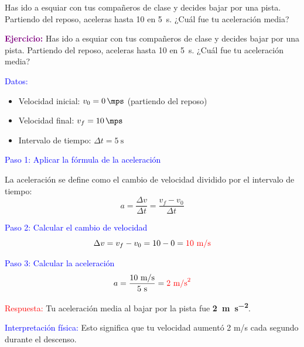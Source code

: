 \begin{exercise}
    Has ido a esquiar con tus compañeros de clase y decides bajar por una pista. Partiendo del reposo, aceleras hasta \qty{10}{\mps} en \qty{5}{\s}. ¿Cuál fue tu aceleración media?
    \begin{solu}
        \textbf{\textcolor{purple}{Ejercicio:}} Has ido a esquiar con tus compañeros de clase y decides bajar por una pista. Partiendo del reposo, aceleras hasta \qty{10}{\mps} en \qty{5}{\s}. ¿Cuál fue tu aceleración media?

        \vspace{0.3cm}

        \textcolor{blue}{Datos:}
        \begin{itemize}
            \item Velocidad inicial: $v_0 = \qty{0}{\mps}$ (partiendo del reposo)
            \item Velocidad final: $v_f = \qty{10}{\mps}$
            \item Intervalo de tiempo: $\Delta t = \qty{5}{\s}$
        \end{itemize}

        \textcolor{blue}{Paso 1: Aplicar la fórmula de la aceleración}

        La aceleración se define como el cambio de velocidad dividido por el intervalo de tiempo:
        \[
            \boxed{a = \frac{\Delta v}{\Delta t} = \frac{v_f - v_0}{\Delta t}}
        \]

        \textcolor{blue}{Paso 2: Calcular el cambio de velocidad}
        \[
            \Delta v = v_f - v_0 = 10 - 0 = \textcolor{red}{10 \text{ m/s}}
        \]

        \textcolor{blue}{Paso 3: Calcular la aceleración}
        \[
            a = \frac{10 \text{ m/s}}{5 \text{ s}} = \textcolor{red}{2 \text{ m/s}^2}
        \]

        \textcolor{red}{Respuesta:} Tu aceleración media al bajar por la pista fue \textbf{\qty{2}{\metre\per\second\squared}}.

        \textcolor{blue}{Interpretación física:} Esto significa que tu velocidad aumentó 2 m/s cada segundo durante el descenso.
    \end{solu}
\end{exercise}


